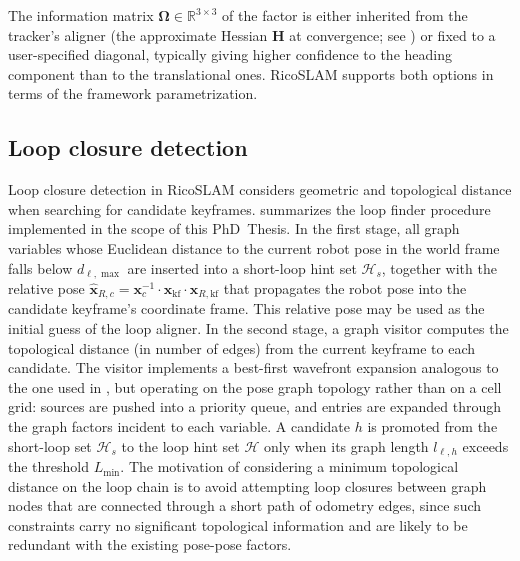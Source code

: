 The information matrix $\boldsymbol{\Omega}\in\mathbb{R}^{3\times3}$ of the
factor is either inherited from the tracker's aligner (the approximate
Hessian $\mathbf{H}$ at convergence; see
) or fixed
to a user-specified diagonal, typically giving higher confidence to the heading
component than to the translational ones. RicoSLAM supports both options
in terms of the framework parametrization.

\subsection{Loop closure detection}\label{sec:slam:online:loop-closure}

Loop closure detection in RicoSLAM considers geometric and topological distance
when searching for candidate keyframes. 
summarizes the loop finder procedure implemented in the scope of this PhD~Thesis.
In the first stage, all graph variables whose Euclidean distance to the current
robot pose in the world frame falls below $d_{\ell,\max}$ are inserted into
a short-loop hint set $\mathcal{H}_s$, together with the relative pose
$\hat{\mathbf{x}}_{R,c} =
\mathbf{x}_c^{-1}\cdot\mathbf{x}_{\mathrm{kf}}\cdot\mathbf{x}_{R,\mathrm{kf}}$
that propagates the robot pose into the candidate keyframe's coordinate frame.
This relative pose may be used as the initial guess of the loop aligner.
In the second stage, a graph visitor computes the topological distance
(in number of edges) from the current keyframe to each candidate.
The visitor implements a best-first wavefront expansion analogous to the one
used in ,
but operating on the pose graph topology rather than on a cell grid:
sources are pushed into a priority queue, and entries are expanded through
the graph factors incident to each variable. A candidate $h$ is promoted from
the short-loop set $\mathcal{H}_s$ to the loop hint set $\mathcal{H}$ only when
its graph length $l_{\ell,h}$ exceeds the threshold $L_{\min}$.
The motivation of considering a minimum topological distance on the loop chain
is to avoid attempting loop closures between graph nodes that are connected
through a short path of odometry edges, since such constraints carry no
significant topological information and are likely to be redundant
with the existing pose-pose factors.



